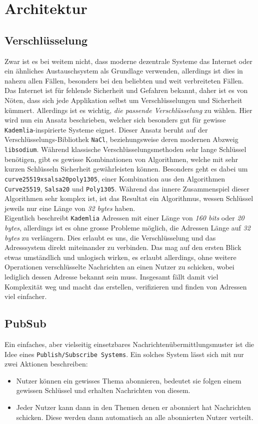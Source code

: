 \documentclass[a4paper,11pt,titlepage,twoside]{memoir}
\begin{document}
\section{Architektur}
\label{sec:orgadd8c59}
\subsection{Verschlüsselung}
\label{sec:orga7803c2}
Zwar ist es bei weitem nicht, dass moderne dezentrale Systeme das
Internet oder ein ähnliches Austauschsystem als Grundlage verwenden,
allerdings ist dies in nahezu allen Fällen, besonders bei den
beliebten und weit verbreiteten Fällen. Das Internet ist für fehlende
Sicherheit und Gefahren bekannt, daher ist es von Nöten, dass sich
jede Applikation selbst um Verschlüsselungen und Sicherheit kümmert.
Allerdings ist es wichtig, \emph{die passende Verschlüsselung} zu wählen.
Hier wird nun ein Ansatz beschrieben, welcher sich besonders gut für
gewisse \texttt{Kademlia}-inspirierte Systeme eignet. Dieser Ansatz beruht auf
der Verschlüsselungs-Bibliothek \texttt{NaCl}, beziehungsweise deren modernen
Abzweig \texttt{libsodium}. Während klassische Verschlüsselungsmethoden sehr
lange Schlüssel benötigen, gibt es gewisse Kombinationen von
Algorithmen, welche mit sehr kurzen Schlüsseln Sicherheit
gewährleisten können. Besonders geht es dabei um
\texttt{curve25519xsalsa20poly1305}, einer Kombination aus den Algorithmen
\texttt{Curve25519}, \texttt{Salsa20} und \texttt{Poly1305}. Während das innere Zusammenspiel
dieser Algorithmen sehr komplex ist, ist das Resultat ein
Algorithmus, wessen Schlüssel jeweils nur eine Länge von \emph{32 bytes}
haben.\\

\noindent Eigentlich beschreibt \texttt{Kademlia} Adressen mit einer Länge von
\emph{160 bits} oder \emph{20 bytes}, allerdings ist es ohne grosse Probleme
möglich, die Adressen Länge auf \emph{32 bytes} zu verlängern. Dies erlaubt
es uns, die Verschlüsselung und das Adresssystem direkt miteinander zu
verbinden. Das mag auf den ersten Blick etwas umständlich und
unlogisch wirken, es erlaubt allerdings, ohne weitere Operationen
verschlüsselte Nachrichten an einen Nutzer zu schicken, wobei
lediglich dessen Adresse bekannt sein muss. Insgesamt fällt damit viel
Komplexität weg und macht das erstellen, verifizieren und finden von
Adressen viel einfacher.
\subsection{PubSub}
\label{sec:org5b99307}
Ein einfaches, aber vielseitig einsetzbares
Nachrichtenübermittlungsmuster ist die Idee eines \texttt{Publish/Subscribe
Systems}. Ein solches System lässt sich mit nur zwei Aktionen
beschreiben: 
\begin{itemize}
\item Nutzer können ein gewisses Thema abonnieren, bedeutet sie folgen
einem gewissen Schlüssel und erhalten Nachrichten von diesem.
\item Jeder Nutzer kann dann in den Themen denen er abonniert hat
Nachrichten schicken. Diese werden dann automatisch an alle
abonnierten Nutzer verteilt.
\end{itemize}
\end{document}
